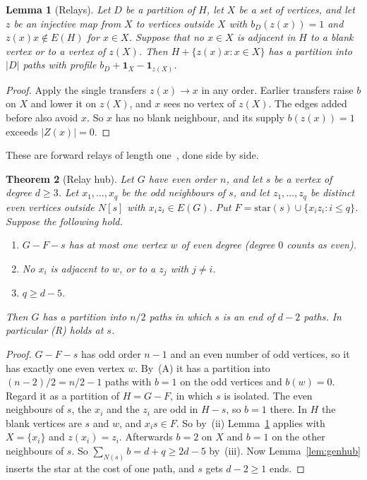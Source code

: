 \documentclass[11pt]{amsart}
\newtheorem{theorem}{Theorem}[section]
\newtheorem{lemma}[theorem]{Lemma}
\theoremstyle{definition}
\begin{document}
\begin{lemma}[Relays]\label{lem:relays}
Let $D$ be a partition of $H$, let $X$ be a set of vertices, and let $z$ be an injective map from
$X$ to vertices outside $X$ with $b_D(z(x))=1$ and $z(x)x\notin E(H)$ for $x\in X$. Suppose that
no $x\in X$ is adjacent in $H$ to a blank vertex or to a vertex of $z(X)$. Then
$H+\{z(x)x:x\in X\}$ has a partition into $|D|$ paths with profile
$b_D+\mathbf 1_X-\mathbf 1_{z(X)}$.
\end{lemma}
\begin{proof}
Apply the single transfers $z(x)\to x$ in any order. Earlier transfers raise $b$ on $X$ and lower
it on $z(X)$, and $x$ sees no vertex of $z(X)$. The edges added before also avoid $x$. So $x$ has
no blank neighbour, and its supply $b(z(x))=1$ exceeds $|Z(x)|=0$.
\end{proof}
These are forward relays of length one~\cite[Lemma~2.3(a)]{D6}, done side by side.

\begin{theorem}[Relay hub]\label{thm:relayhub}
Let $G$ have even order $n$, and let $s$ be a vertex of degree $d\ge3$. Let $x_1,\dots,x_q$ be the
odd neighbours of $s$, and let $z_1,\dots,z_q$ be distinct even vertices outside $N[s]$ with
$x_iz_i\in E(G)$. Put $F=\mathrm{star}(s)\cup\{x_iz_i:i\le q\}$. Suppose the following hold.
\begin{enumerate}[label=(\roman*)]
\item $G-F-s$ has at most one vertex $w$ of even degree (degree $0$ counts as even).
\item No $x_i$ is adjacent to $w$, or to a $z_j$ with $j\ne i$.
\item $q\ge d-5$.
\end{enumerate}
Then $G$ has a partition into $n/2$ paths in which $s$ is an end of $d-2$ paths. In particular
(R) holds at $s$.
\end{theorem}
\begin{proof}
$G-F-s$ has odd order $n-1$ and an even number of odd vertices, so it has exactly one even vertex
$w$. By~(A) it has a partition into $(n-2)/2=n/2-1$ paths with $b=1$ on the odd vertices and
$b(w)=0$. Regard it as a partition of $H=G-F$, in which $s$ is isolated. The even neighbours of
$s$, the $x_i$ and the $z_i$ are odd in $H-s$, so $b=1$ there. In $H$ the blank vertices are
$s$ and $w$, and $x_is\in F$. So by~(ii) Lemma~\ref{lem:relays} applies with $X=\{x_i\}$ and
$z(x_i)=z_i$. Afterwards $b=2$ on $X$ and $b=1$ on the other neighbours of $s$. So
$\sum_{N(s)}b=d+q\ge2d-5$ by~(iii). Now Lemma~\ref{lem:genhub} inserts the star at the cost of
one path, and $s$ gets $d-2\ge1$ ends.
\end{proof}
\end{document}
